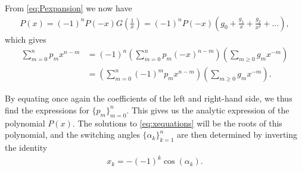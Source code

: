 \documentclass[a4paper]{report}
\begin{document}
From \eqref{eq:Pexpansion} we now have
\begin{align*}
	P(x) = (-1)^nP(-x)G\left(\frac 1x\right) = (-1)^nP(-x)\left(g_0 + \frac{g_1}{x} + \frac{g_2}{x^2} + \ldots\right),
\end{align*}
which gives
\begin{align*}
	\sum_{m=0}^n p_m x^{n-m} &= (-1)^n \left(\sum_{m=0}^n p_m (-x)^{n-m}\right)\left(\sum_{m\geq 0} g_m x^{-m}\right) 
	\\
	&= \left(\sum_{m=0}^n (-1)^m p_m x^{n-m}\right)\left(\sum_{m\geq 0} g_m x^{-m}\right).
\end{align*}

By equating once again the coefficients of the left and right-hand side, we thus find the expressions for $\{p_m\}_{m=0}^n$. This gives us the analytic expression of the polynomial $P(x)$. The solutions to \eqref{eq:xequations} will be the roots of this polynomial, and the switching angles $\{\alpha_k\}_{k=1}^n$ are then determined by inverting the identity
\begin{align*}
	x_k = -(-1)^k\cos(\alpha_k).
\end{align*}
\end{document}
